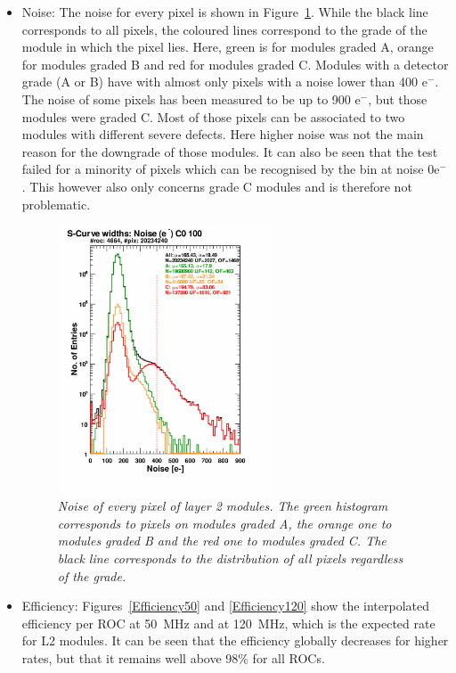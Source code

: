 \documentclass[a4paper,12pt,twoside]{article}
\begin{document}
\begin{itemize}
\item Noise:
The noise for every pixel is shown in Figure~\ref{L2Noise}. While the black line corresponds to all pixels, the coloured lines correspond to the grade of the module in which the pixel lies. Here, green is for modules graded A, orange for modules graded B and red for modules graded C. Modules with a detector grade (A or B) have with almost only pixels with a noise lower than 400 e$^-$. The noise of some pixels has been measured to be up to 900 e$^-$, but those modules were graded C. Most of those pixels can be associated to two modules with different severe defects. Here higher noise was not the main reason for the downgrade of those modules. It can also be seen that the test failed for a minority of pixels which can be recognised by the bin at noise 0e$^-$. This however also only concerns grade C modules and is therefore not problematic.

\begin{figure} [h!] \centering 
\includegraphics[width=0.6\textwidth, angle=0] {./Figures/Xray_NoisePerPixel.pdf}
\caption{\em  \label{L2Noise}
Noise of every pixel of layer 2 modules. The green histogram corresponds to pixels on modules graded A, the orange one to modules graded B and the red one to modules graded C. The black line corresponds to the distribution of all pixels regardless of the grade.}
\end{figure}

\item Efficiency: 
Figures~\ref{Efficiency50} and \ref{Efficiency120} show the interpolated efficiency per ROC at \SI{50}{\mega\hertz} and at \SI{120}{\mega\hertz}, which is the expected rate for L2 modules. It can be seen that the efficiency globally decreases for higher rates, but that it remains well above 98\% for all ROCs. 


\end{itemize}
\end{document}
